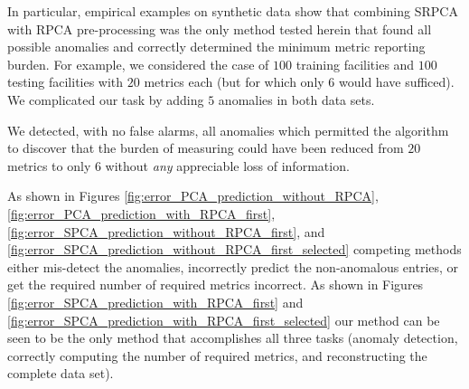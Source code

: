 \documentclass[conference]{IEEEtran}
\begin{document}
In particular, empirical examples on synthetic data show that combining SRPCA with RPCA pre-processing was the only method tested herein that found all possible anomalies 
and correctly determined the minimum metric reporting burden. For example, we considered the case of $100$ training facilities and $100$ testing facilities with $20$ metrics each (but for which only $6$ would have sufficed). We complicated our task by adding $5$ anomalies in both  data sets.  

We detected, with no false alarms, all anomalies which permitted the algorithm to discover that the burden of measuring could have been reduced from $20$ metrics to only $6$ without \emph{any} appreciable loss of information.  

As shown in Figures \ref{fig:error_PCA_prediction_without_RPCA}, \ref{fig:error_PCA_prediction_with_RPCA_first}, \ref{fig:error_SPCA_prediction_without_RPCA_first}, and \ref{fig:error_SPCA_prediction_without_RPCA_first_selected} competing methods either mis-detect the anomalies, incorrectly predict the non-anomalous entries, or get the required number of required metrics incorrect.
As shown in Figures \ref{fig:error_SPCA_prediction_with_RPCA_first} and \ref{fig:error_SPCA_prediction_with_RPCA_first_selected} our method can be seen to be the only method that accomplishes all three tasks (anomaly detection, correctly computing the number of required metrics, and reconstructing the complete data set).

\end{document}
